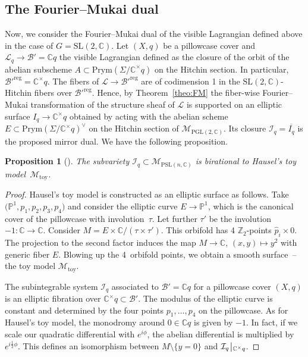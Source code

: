\documentclass[pdftex]{sigma}
\numberwithin{equation}{section}
\newtheorem{prop}[theo]{Proposition}
\theoremstyle{definition}
\newcommand{\reg}{\mathrm{reg}}
\newcommand{\toy}{\mathrm{toy}}
\newcommand{\rest}{\: \rule[-3.5pt]{0.5pt}{11.5pt}\,{}}
\renewcommand{\to}{\rightarrow}
\newcommand{\wh}{\widehat}
\newcommand{\calB}{\mathcal{B}}
\newcommand{\calI}{\mathcal{I}}
\newcommand{\calL}{\mathcal{L}}
\newcommand{\calM}{\mathcal{M}}
\newcommand{\ZZ}{\mathbb{Z}}
\newcommand{\CC}{\mathbb{C}}
\newcommand{\PP}{\mathbb{P}}
\newcommand{\Prym}{\mathrm{Prym}}
\newcommand{\SL}{\mathrm{SL}}
\newcommand{\PSL}{\mathrm{PSL}}
\newcommand{\PGL}{\mathrm{PGL}}
\begin{document}
\subsection{The Fourier--Mukai dual}
Now, we consider the Fourier--Mukai dual of the visible Lagrangian defined above in the case of $G=\SL(2,\CC)$. Let $(X,q)$ be a pillowcase cover and $\calL_q \to \calB'=\CC q$ the visible Lagrangian defined as the closure of the orbit of the abelian subscheme $A \subset \Prym(\Sigma/\CC^\times q)$ on the Hitchin section. In particular, $\calB'^\reg=\CC^\times q$. The fibers of $\calL \to \calB'^\reg$ are of codimension 1 in the $\SL(2,\CC)$-Hitchin fibers over $\calB'^\reg$. Hence, by Theorem~\ref{theo:FM} the fiber-wise Fourier--Mukai transformation of the structure sheaf of $\calL$ is supported on an elliptic surface $I_q \rightarrow \CC^\times q$ obtained by acting with the abelian scheme $E \subset \Prym(\Sigma/\CC^\times q)^\vee$ on the Hitchin section of $\calM_{\PGL(2,\CC)}$. Its closure $\calI_q=\overline{I_q}$ is the proposed mirror dual. We have the following proposition.
\begin{prop}[\cite{HauselToy}]\label{prop:Hausel_toy} The subvariety $\calI_q \!\subset\! \calM_{\PSL(n,\CC)}$ is birational to Hausel's toy model~$\calM_\toy$.
\end{prop}
\begin{proof}
 Hausel's toy model is constructed as an elliptic surface as follows. Take $\bigl(\PP^1,p_1,p_2,p_3,p_4\bigr)$ and consider the elliptic curve $E \to \PP^1$, which is the canonical cover of the pillowcase with involution~$\tau$. Let further $\tau'$ be the involution $-1\colon \CC \to \CC$. Consider $M=E \times \CC/(\tau \times \tau')$. This orbifold has 4 $\ZZ_2$-points $\wh{p}_i \times 0$. The projection to the second factor induces the map $M \to \CC$, $(x,y) \mapsto y^2 $ with generic fiber $E$. Blowing up the 4~orbifold points, we obtain a smooth surface~-- the toy model $\calM_{\toy}$.

 The subintegrable system $\calI_q$ associated to $\calB'=\CC q$ for a pillowcase cover $(X,q)$ is an elliptic fibration over $\CC^\times q \subset \calB'$. The modulus of the elliptic curve is constant and determined by the four points $p_1,\dots,p_4$ on the pillowcase. As for Hausel's toy model, the monodromy around $0 \in \CC q$ is given by $-1$. In fact, if we scale our quadratic differential with $e^{i\phi}$, the abelian differential is multiplied by $e^{i\frac12 \phi}$. This defines an isomorphism between $M\setminus{\{y=0\}}$ and $\calI_q \rest_{\CC^\times q}$.
\end{proof}
\end{document}
